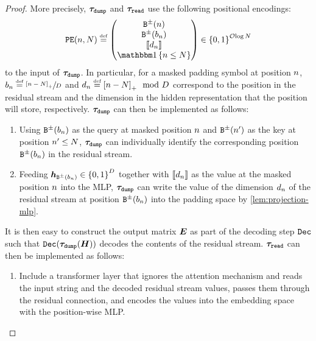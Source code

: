 \begin{proof}
   More precisely, ${{{{\boldsymbol{\tau}}}_{\texttt{dump}}}}$ and ${{{{\boldsymbol{\tau}}}_{\texttt{read}}}}$ use the following positional encodings:
   \begin{equation}
      \posEncFun{\stridx, \strlen} \defeq 
      \begin{pmatrix}
         \sbinFun{\stridx} \\
         \sbinFun{\paddingBlock_\stridx} \\
         \onehot{\dimidx_\stridx}  \\
         \ind{\stridx \leq \strlen}
      \end{pmatrix} \in \set{0, 1}^{\bigO{\log\strlen}}
   \end{equation}
   to the input of ${{{{\boldsymbol{\tau}}}_{\texttt{dump}}}}$.
   In particular, for a masked padding symbol at position ${{n}}$, ${{b}}_{{n}} \mathrel{\stackrel{\textnormal{\tiny def}}{=}} \sfrac{{\left[ {{n}} - {{N}} \right]_{+}}}{{{D}}}$ and ${{d}}_{{n}} \mathrel{\stackrel{\textnormal{\tiny def}}{=}} {\left[ {{n}} - {{N}} \right]_{+}} \mod {{{D}}}$ correspond to the position in the residual stream and the dimension in the hidden representation that the position will store, respectively.
   ${{{{\boldsymbol{\tau}}}_{\texttt{dump}}}}$ can then be implemented as follows:
   \begin{enumerate}[label=(\arabic*)]
      \item Using $\sbinFun{\paddingBlock_\stridx}$ as the query at masked position ${{n}}$ and $\sbinFun{\stridx'}$ as the key at position ${{n}}' \leq {{N}}$, ${{{{\boldsymbol{\tau}}}_{\texttt{dump}}}}$ can individually identify the corresponding position $\sbinFun{\paddingBlock_\stridx}$ in the residual stream.
      \item Feeding $\hiddState_{\sbinFun{\paddingBlock_\stridx}} \in \set{0, 1}^\hiddDim$ together with ${{\llbracket{{d}}_{{n}}\rrbracket}}$ as the value at the masked position ${{n}}$ into the MLP, ${{{{\boldsymbol{\tau}}}_{\texttt{dump}}}}$ can write the value of the dimension ${{d}}_{{n}}$ of the residual stream at position $\sbinFun{\paddingBlock_\stridx}$ into the padding space by \cref{lem:projection-mlp}.
   \end{enumerate}
   It is then easy to construct the output matrix ${{{{{\bm{E}}}}}}$ as part of the decoding step ${{\texttt{Dec}}}$ such that $\decodeStep(\dumpLayerFun{\residStream})$ decodes the contents of the residual stream.
   ${{{{\boldsymbol{\tau}}}_{\texttt{read}}}}$ can then be implemented as follows:
   \begin{enumerate}[label=(\arabic*)]
      \item Include a transformer layer that ignores the attention mechanism and reads the input string and the decoded residual stream values, passes them through the residual connection, and encodes the values into the embedding space with the position-wise MLP.

\end{enumerate}
\end{proof}
